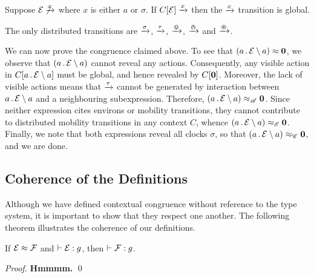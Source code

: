 \documentclass[orivec,envcountsame]{llncs}
\newcommand{\Eq}{\approx}
\newcommand{\EqA}{\mathrel{\Eq_{\mathscr{A}}}}
\newcommand{\EqC}{\mathrel{\Eq_{\mathscr{C}}}} %
\newcommand{\EqE}{\mathrel{\Eq_{\mathscr{E}}}} %
\newcommand{\Does}[1]{\xderives{#1}}
\newcommand{\Theorem}{\vdash}
\newcommand{\OfType}{\mathrel{:}}
\begin{document}
\begin{proposition}
Suppose $\expr \not\Does{x}$ where $x$ is either $a$ or $\sigma$. If
$C[\expr] \Does{x}$ then the $\Does{x}$ transition is global.
\end{proposition}

\begin{proposition}
The only distributed transitions are $\Does{\sigma}$, $\Does{\tau}$,
$\Does{\tin}$, $\Does{\tout}$ and $\Does{\topen}$.
\end{proposition}

We can now prove the congruence claimed above. To see that
$\left(a\pref\expr \res{a}\right) \Eq \nil$, we observe that
$\left(a\,.\,\text{$\mathcal{E}$} \setminus {a}\right)$ cannot reveal any
actions. Consequently, any visible action in $C[a\,.\,\text{$\mathcal{E}$} \setminus {a}]$
must be global, and hence revealed by $C[\textbf{0}]$. Moreover, the lack of
visible actions means that $\Does{\tau}$ cannot be generated by
interaction between $a\,.\,\text{$\mathcal{E}$} \setminus {a}$ and a neighbouring
subexpression. Therefore, $\left(a\pref\expr \res{a}\right) \EqA
\nil$. Since neither expression cites environs or mobility transitions,
they cannot contribute to distributed mobility transitions in any
context $C$, whence $\left(a\pref\expr \res{a}\right) \EqE
\nil$. Finally, we note that both expressions reveal all clocks
$\sigma$, so that $\left(a\pref\expr \res{a}\right) \EqC \nil$, and we
are done.


\subsection{Coherence of the Definitions}
Although we have defined contextual congruence without reference to the
type system, it is important to show that they respect one another. The
following theorem illustrates the coherence of our definitions.

\begin{theorem}
If $\expr \Eq \exprb$ and $\Theorem \expr \OfType g$, then $\Theorem
\exprb \OfType g$.
\end{theorem}
\begin{proof}
\textbf{Hmmmm.} 
\qed \end{proof}



\end{document}
